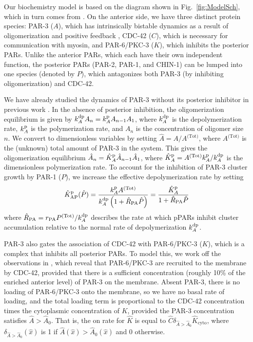 \documentclass[11pt]{article}
\newcommand{\6}[1]{#1_{\text{6}}}
\newcommand{\3}[1]{#1_{\text{3}}}
\newcommand{\Tot}[1]{#1^\text{(Tot)}}
\begin{document}
Our biochemistry model is based on the diagram shown in Fig.\ \ref{fig:ModelSch}, which in turn comes from \cite[Fig.~2]{lang2017proteins}. On the anterior side, we have three distinct protein species: PAR-3 ($A$), which has intrinsically bistable dynamics as a result of oligomerization and positive feedback \cite{lang2023oligomerization}, CDC-42 ($C$), which is necessary for communication with myosin, and PAR-6/PKC-3 ($K$), which inhibits the posterior PARs. Unlike the anterior PARs, which each have their own independent function, the posterior PARs (PAR-2, PAR-1, and CHIN-1) can be lumped into one species (denoted by $P$), which antagonizes both PAR-3 (by inhibiting oligomerization) and CDC-42. 

We have already studied the dynamics of PAR-3 without its posterior inhibitor in previous work  \cite{lang2023oligomerization}. In the absence of posterior inhibition, the oligomerization equilibrium is given by $k^\text{dp}_A A_n = k^\text{p}_A A_{n-1} A_1$, where $k^\text{dp}_A$ is the depolymerization rate, $k^\text{p}_A$ is the polymerization rate, and $A_n$ is the concentration of oligomer size $n$. We convert to dimensionless variables by setting $\hat A = A / \Tot{A}$, where $\Tot{A}$ is the (unknown) total amount of PAR-3 in the system. This gives the oligomerization equilibrium $\hat A_n = \hat{K}^\text{p}_A \hat A_{n-1} \hat A_1$, where $\KhatpA=\Tot{A} \kp_A/\kdp_A$ is the dimensionless polymerization rate. To account for the inhibition of PAR-3 cluster growth by PAR-1 ($P$), we increase the effective depolymerization rate by setting
\begin{gather}
\label{eq:QSSP}
\KhatpAP (\hat P )=\frac{\kp_A \Tot{A}}{\kdp_A\left(1+\hat R_\text{PA} \hat P\right)} =\frac{\KhatpA}{1+\hat R_\text{PA} \hat P}
\end{gather}
where $\hat R_\text{PA} = r_\text{PA}\Tot{P}/\kdp_A$ describes the rate at which pPARs inhibit cluster accumulation relative to the normal rate of depolymerization $k^\text{dp}_A$. 

PAR-3 also gates the association of CDC-42 with PAR-6/PKC-3 ($K$), which is a complex that inhibits all posterior PARs. To model this, we work off the observations in \cite{sailer2015dynamic}, which reveal that PAR-6/PKC-3 are recruited to the membrane by CDC-42, provided that there is a sufficient concentration (roughly 10\% of the enriched anterior level) of PAR-3 on the membrane. Absent PAR-3, there is no loading of PAR-6/PKC-3 onto the membrane, so we have no basal rate of loading, and the total loading term is proportional to the CDC-42 concentration times the cytoplasmic concentration of $K$, provided the PAR-3 concentration satisfies $\hat A > \hat A_0$. That is, the on rate for $\hat K$ is equal to $\hat{C} \delta_{\hat A > \hat A_0}\hat K_\text{cyto}$, where $\delta_{\hat A > \hat A_0}(\hat x)$ is 1 if $\hat A(\hat x) > \hat A_0(\hat x)$ and 0 otherwise. 
\end{document}
